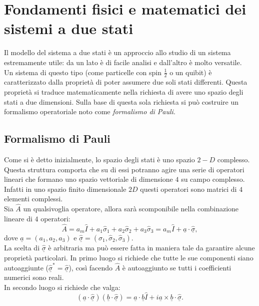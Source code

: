 \section{Fondamenti fisici e matematici dei sistemi a due stati}
Il modello del sistema a due stati è un approccio allo studio di un sistema estremamente utile: da un lato è di facile analisi e dall'altro è molto versatile.\\ 
Un sistema di questo tipo (come particelle con spin $\frac{1}{2}$ o un quibit) è caratterizzato dalla proprietà di poter assumere due soli stati differenti. Questa proprietà si traduce matematicamente nella richiesta di avere uno spazio degli stati a due dimensioni. Sulla base di questa sola richiesta si può costruire un formalismo operatoriale noto come \emph{formalismo di Pauli}.

\subsection{Formalismo di Pauli}
Come si è detto inizialmente, lo spazio degli stati è uno spazio $2-D$ complesso. Questa struttura comporta che su di essi potranno agire una serie di operatori lineari che formano uno spazio vettoriale di dimensione $4$ su campo complesso. Infatti in uno spazio finito dimensionale $2D$ questi operatori sono matrici di $4$ elementi complessi.\\Sia $\hat{A}$ un qualsivoglia operatore, allora sarà scomponibile nella combinazione lineare di $4$ operatori:
\begin{equation*}
    \hat{A}=a_m\hat{I}+a_1\hat{\sigma}_1+a_2\hat{\sigma}_2+a_3\hat{\sigma}_3=a_m\hat{I}+\underline{a}\cdot\hat{\underline{\sigma}},
\end{equation*} 
dove $\underline{a}=(a_1,a_2,a_3)$ e $\hat{\underline{\sigma}}=(\hat{\sigma}_1,\hat{\sigma}_2,\hat{\sigma}_3)$.\\
La scelta di $\hat{\underline{\sigma}}$ è arbitraria ma può essere fatta in maniera tale da garantire alcune proprietà particolari. In primo luogo si richiede che tutte le sue componenti siano autoaggiunte ($\hat{\underline{\sigma}}^*=\hat{\underline{\sigma}}$), così facendo $\hat{A}$ è autoaggiunto se tutti i coefficienti numerici sono reali.\\
In secondo luogo si richiede che valga:
\begin{equation*}
    (\underline{a}\cdot\hat{\underline{\sigma}})(\underline{b}\cdot\hat{\underline{\sigma}})=\underline{a}\cdot\underline{b}\hat{I}+i\underline{a}\times \underline{b}\cdot \hat{\underline{\sigma}}.
\end{equation*}

